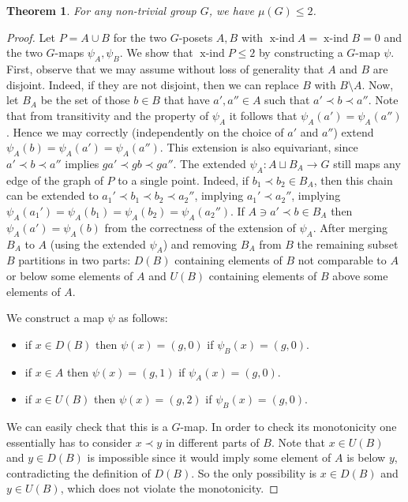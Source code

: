 \documentclass[preprint,12pt]{article}
\renewcommand{\le}{\leqslant}
\newtheorem{theorem}{Theorem}[section]
\theoremstyle{definition}
\theoremstyle{remark}
\numberwithin{equation}{section}
\DeclareMathOperator{\xind}{x-ind}
\begin{document}
\begin{theorem}\label{thm:bound <=2}
    For any non-trivial group $G$, we have $\mu(G)\le 2$.
\end{theorem}
\begin{proof}
    Let $P=A\cup B$ for 
    the two $G$-posets $A,B$ with $\xind A=\xind B=0$ and the two $G$-maps $\psi_A,\psi_B$. We show that $\xind P\le 2$ by constructing a $G$-map $\psi$. First, observe that we may assume without loss of generality that $A$ and $B$ are disjoint. Indeed, if they are not disjoint, then we can replace $B$ with $B \setminus A$. Now, let $B_A$ be the set of those $b\in B$ that have $a',a''\in A$ such that $a'\prec b\prec a''$. Note that from transitivity and the property of $\psi_A$ it follows that $\psi_A(a')=\psi_A(a'')$. Hence we may correctly (independently on the choice of $a'$ and $a''$) extend $\psi_A(b)=\psi_A(a')=\psi_A(a'')$. This extension is also equivariant, since $a'\prec b\prec a''$ implies $ga'\prec gb\prec ga''$. The extended $\psi_A : A\sqcup B_A\to G$ still maps any edge of the graph of $P$ to a single point. Indeed, if $b_1\prec b_2\in B_A$, then this chain can be extended to $a_1'\prec b_1\prec b_2\prec a_2''$, implying $a_1'\prec a_2''$, implying $\psi_A(a_1')=\psi_A(b_1)=\psi_A(b_2)=\psi_A(a_2'')$. If $A\ni a'\prec b\in B_A$ then $\psi_A(a')=\psi_A(b)$ from the correctness of the extension of $\psi_A$. After merging $B_A$ to $A$ (using the extended $\psi_A$) and removing $B_A$ from $B$ the remaining subset $B$ partitions in two parts: $D(B)$ containing elements of $B$ not comparable to $A$ or below some elements of $A$ and $U(B)$ containing elements of $B$ above some elements of $A$.

    We construct a map $\psi$ as follows:
    \begin{itemize}
        \item if $x\in D(B)$ then $\psi(x) = (g,0)$ if $\psi_B(x) = (g,0)$.
        \item if $x\in A$ then $\psi(x) = (g,1)$ if $\psi_A(x) = (g,0)$.
        \item if $x\in U(B)$ then $\psi(x) = (g,2)$ if $\psi_B(x) = (g,0)$.
    \end{itemize}

    We can easily check that this is a $G$-map. In order to check its monotonicity one essentially has to consider $x\prec y$ in different parts of $B$. Note that $x\in U(B)$ and $y\in D(B)$ is impossible since it would imply some element of $A$ is below $y$, contradicting the definition of $D(B)$. So the only possibility is $x\in D(B)$ and $y\in U(B)$, which does not violate the monotonicity.
\end{proof}
\end{document}
